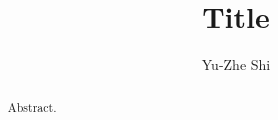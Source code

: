 \documentclass{report}
\title{Title}
\author{Yu-Zhe Shi}
\begin{document}
\newtheorem{proof}{\hspace{2em}Proof}
\newtheorem{lemma}{\hspace{2em}Lemma}
\newtheorem{definition}{\hspace{2em}Definition}
\newtheorem{proposition}{\hspace{2em}Proposition}
\maketitle
\begin{abstract}
    Abstract.
\end{abstract}
\end{document}
